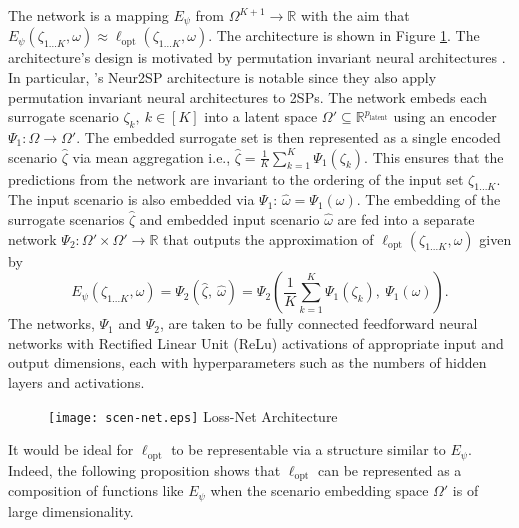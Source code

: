The network is a mapping $E_{\psi}$ from $\Omega^{K+1} \rightarrow \mathbb{R}$ with the aim that $E_{\psi}(\zeta_{1...K}, \omega) \approx \ell_{\text{opt}}(\zeta_{1...K}, \omega)$. The architecture is shown in Figure \ref{fig:lossnet}. The architecture's design is motivated by permutation invariant neural architectures \citep{zaheer2017deep,tabaghi2024universal}. In particular, \citet{patel2022neur2sp}'s Neur2SP architecture is notable since they also apply permutation invariant neural architectures to 2SPs. The network embeds each surrogate scenario $\zeta_k,\  k \in [K]$ into a latent space $\Omega' \subseteq \mathbb{R}^{p_{\text{latent}}}$ using an encoder $ \Psi_1 : \Omega \rightarrow \Omega'$. The embedded surrogate set is then represented as a single encoded scenario $\hat{\zeta}$ via mean aggregation i.e., $\hat{\zeta} = \frac{1}{K} \sum_{k=1}^K  \Psi_1(\zeta_{k})$. This ensures that the predictions from the network are invariant to the ordering of the input set $\zeta_{1...K}$. The input scenario is also embedded via $\Psi_1$: $\hat{\omega} =  \Psi_1(\omega)$. The embedding of the surrogate scenarios $\hat{\zeta}$ and embedded input scenario $\hat{\omega}$ are fed into a separate network $ \Psi_2:\Omega' \times \Omega' \rightarrow \mathbb{R}$ that outputs the approximation of $\ell_{\text{opt}}(\zeta_{1...K}, \omega)$ given by $$E_{\psi}(\zeta_{1...K}, \omega) = \Psi_2\left(\hat{\zeta},\  \hat{\omega}\right) = \Psi_2\left(\frac{1}{K} \sum_{k = 1}^K  \Psi_1(\zeta_k),\  \Psi_1(\omega) \right).$$ The networks, $\Psi_1$ and $\Psi_2$, are taken to be fully connected feedforward neural networks with Rectified Linear Unit (ReLu) activations of appropriate input and output dimensions, each with hyperparameters such as the numbers of hidden layers and activations. 


\begin{figure}[h]
  \FIGURE
   {\texttt{[image: scen-net.eps]}}
    {Loss-Net Architecture
    \label{fig:lossnet}}
    {}
  \end{figure}

It would be ideal for $\ell_{\text{opt}}$ to be representable via a structure similar to $E_{\psi}$. Indeed, the following proposition shows that $\ell_{\text{opt}}$ can be represented as a composition of functions like $E_{\psi}$ when the scenario embedding space $\Omega'$ is of large dimensionality.

